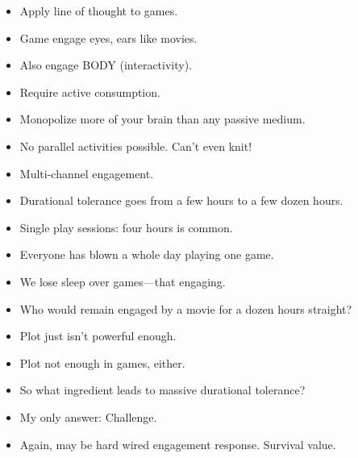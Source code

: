 \documentclass[12pt]{article}
\begin{document}
{\begin{itemize}
\item Apply line of thought to games.

\item Game engage eyes, ears like movies.

\item Also engage BODY (interactivity).

\item Require active consumption.

\item Monopolize more of your brain than any passive medium.

\item No parallel activities possible.  Can't even knit!
\end{itemize}

\begin{itemize}

\item Multi-channel engagement.

\item Durational tolerance goes from a few hours to a few dozen hours.

\item Single play sessions:  four hours is common.

\item Everyone has blown a whole day playing one game.

\item We lose sleep over games---that engaging.

\item Who would remain engaged by a movie for a dozen hours straight?

\item Plot just isn't powerful enough.
\end{itemize}

\begin{itemize}

\item Plot not enough in games, either.

\item So what ingredient leads to massive durational tolerance?

\item My only answer:  Challenge.

\item Again, may be hard wired engagement response.  Survival value.
\end{itemize}

}
\end{document}
